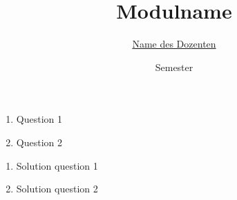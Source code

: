 


\title{Modulname}
\date{Semester}
\author{\href{mailto:name@adress}{Name des Dozenten}}


\newcommand{\sheetnumber}{1}
\newcommand{\publishdate}{09.10.2019}
\newcommand{\handindate}{16.10.2019, 10:00 pm}
\setcounter{aufgabe}{0}




\begin{aufgabe}[subtitle={nice excercise}]
  \begin{enumerate}
    \item Question 1
    \item Question 2
  \end{enumerate}
\end{aufgabe}

\begin{loesung}
  \begin{enumerate}
    \item Solution question 1
    \item Solution question 2
  \end{enumerate}
\end{loesung}



